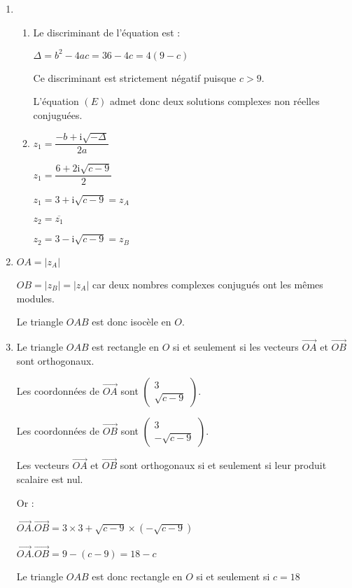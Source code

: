 \begin{corrige}
     \begin{enumerate}
          \item
          \begin{enumerate}[label=\alph*.]
               \item
               Le discriminant de l'équation est :
               \par
               $\Delta = b^2-4ac=36-4c = 4(9-c)$
               \par
               Ce discriminant est strictement négatif puisque $c > 9$.
               \par
               L'équation $(E)$ admet donc deux solutions complexes non réelles conjuguées.
               \item
               $z_1=\dfrac{-b+\text{i}\sqrt{-\Delta}}{2a}$
               \par
               $z_1=\dfrac{6+2\text{i}\sqrt{c-9}}{2}$
               \par
               $z_1=3+\text{i}\sqrt{c-9}=z_A$
               \par

               $z_2=\overline{z_1}$
               \par
               $z_2=3-\text{i}\sqrt{c-9}=z_B$
          \end{enumerate}
          \item
          $OA=\left|z_A \right| $
          \par
          $OB=\left|z_B \right|=\left|z_A \right| $ car deux nombres complexes conjugués ont les mêmes modules.
          \par
          Le triangle $OAB$ est donc isocèle en $O$.
          \item
          Le triangle $OAB$ est rectangle en $O$ si et seulement si les vecteurs $\overrightarrow{OA}$ et $\overrightarrow{OB}$ sont orthogonaux.
          \par
          Les coordonnées de $\overrightarrow{OA}$ sont $\begin{pmatrix} 3 \\ \sqrt{c-9} \end{pmatrix}$.
          \par
          Les coordonnées de $\overrightarrow{OB}$ sont $\begin{pmatrix} 3 \\ -\sqrt{c-9} \end{pmatrix}$.
          \par
          Les vecteurs $\overrightarrow{OA}$ et $\overrightarrow{OB}$ sont orthogonaux si et seulement si leur produit scalaire est nul.
          \par
          Or :
          \par
          $\overrightarrow{OA}.\overrightarrow{OB}=3\times 3+\sqrt{c-9}\times(-\sqrt{c-9})$
          \par
          $\overrightarrow{OA}.\overrightarrow{OB}=9-(c-9)=18-c$
          \par
          Le triangle $OAB$ est donc rectangle en $O$ si et seulement si $c=18$
     \end{enumerate}
\end{corrige}
